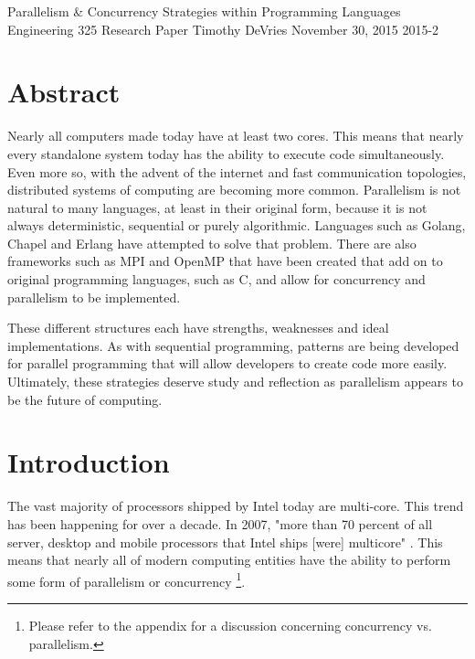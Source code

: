 \documentclass[12pt]{article}
\begin{document}


\buecedefinitions%
    {Parallelism \& Concurrency Strategies within Programming Languages}
    {Engineering 325 Research Paper}
    {Timothy DeVries}
    {November 30, 2015}
    {2015-2}

\buecereporttitlepage

\tableofcontents

\newpage

\section{Abstract}

Nearly all computers made today have at least two cores. This means that nearly every standalone system today has the ability to execute code simultaneously. Even more so, with the advent of the internet and fast communication topologies, distributed systems of computing are becoming more common. Parallelism is not natural to many languages, at least in their original form, because it is not always deterministic, sequential or purely algorithmic. Languages such as Golang, Chapel and Erlang have attempted to solve that problem. There are also frameworks such as MPI and OpenMP that have been created that add on to original programming languages, such as C, and allow for concurrency and parallelism to be implemented. 

These different structures each have strengths, weaknesses and ideal implementations. As with sequential programming, patterns are being developed for parallel programming that will allow developers to create code more easily. Ultimately, these strategies deserve study and reflection as parallelism appears to be the future of computing.

\newpage

\section{Introduction}

The vast majority of processors shipped by Intel today are multi-core. This trend has been happening for over a decade. In 2007, "more than 70 percent of all server, desktop and mobile processors that Intel ships [were] multicore" \cite{multicore_usage}. This means that nearly all of modern computing entities have the ability to perform some form of parallelism or concurrency
\footnote{ Please refer to the appendix for a discussion concerning concurrency vs. parallelism. }.
\end{document}
